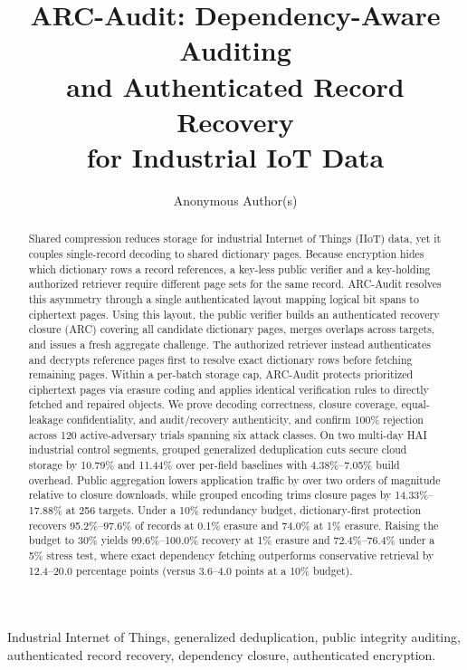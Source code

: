 \documentclass[10pt,journal]{IEEEtran}
\title{ARC-Audit: Dependency-Aware Auditing\\and Authenticated Record Recovery\\for Industrial IoT Data}
\author{Anonymous Author(s)}
\begin{document}
\maketitle
\begin{abstract}
Shared compression reduces storage for industrial Internet of Things (IIoT) data, yet it couples single-record decoding to shared dictionary pages. Because encryption hides which dictionary rows a record references, a key-less public verifier and a key-holding authorized retriever require different page sets for the same record. ARC-Audit resolves this asymmetry through a single authenticated layout mapping logical bit spans to ciphertext pages. Using this layout, the public verifier builds an authenticated recovery closure (ARC) covering all candidate dictionary pages, merges overlaps across targets, and issues a fresh aggregate challenge. The authorized retriever instead authenticates and decrypts reference pages first to resolve exact dictionary rows before fetching remaining pages. Within a per-batch storage cap, ARC-Audit protects prioritized ciphertext pages via erasure coding and applies identical verification rules to directly fetched and repaired objects. We prove decoding correctness, closure coverage, equal-leakage confidentiality, and audit/recovery authenticity, and confirm 100\% rejection across 120 active-adversary trials spanning six attack classes. On two multi-day HAI industrial control segments, grouped generalized deduplication cuts secure cloud storage by 10.79\% and 11.44\% over per-field baselines with 4.38\%--7.05\% build overhead. Public aggregation lowers application traffic by over two orders of magnitude relative to closure downloads, while grouped encoding trims closure pages by 14.33\%--17.88\% at 256 targets. Under a 10\% redundancy budget, dictionary-first protection recovers 95.2\%--97.6\% of records at 0.1\% erasure and 74.0\% at 1\% erasure. Raising the budget to 30\% yields 99.6\%--100.0\% recovery at 1\% erasure and 72.4\%--76.4\% under a 5\% stress test, where exact dependency fetching outperforms conservative retrieval by 12.4--20.0 percentage points (versus 3.6--4.0 points at a 10\% budget).
\end{abstract}
\begin{IEEEkeywords}
Industrial Internet of Things, generalized deduplication, public integrity
auditing, authenticated record recovery, dependency closure, authenticated encryption.
\end{IEEEkeywords}
\end{document}
